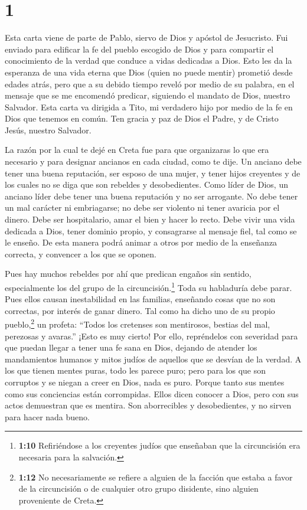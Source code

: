 \hypertarget{section}{%
\section{1}\label{section}}

 Esta carta viene de parte de Pablo, siervo de Dios y
apóstol de Jesucristo. Fui enviado para edificar la fe del pueblo
escogido de Dios y para compartir el conocimiento de la verdad que
conduce a vidas dedicadas a Dios.  Esto les da la esperanza
de una vida eterna que Dios (quien no puede mentir) prometió desde
edades atrás,  pero que a su debido tiempo reveló por medio
de su palabra, en el mensaje que se me encomendó predicar, siguiendo el
mandato de Dios, nuestro Salvador.  Esta carta va dirigida a
Tito, mi verdadero hijo por medio de la fe en Dios que tenemos en común.
Ten gracia y paz de Dios el Padre, y de Cristo Jesús, nuestro Salvador.

 La razón por la cual te dejé en Creta fue para que
organizaras lo que era necesario y para designar ancianos en cada
ciudad, como te dije.  Un anciano debe tener una buena
reputación, ser esposo de una mujer, y tener hijos creyentes y de los
cuales no se diga que son rebeldes y desobedientes.  Como
líder de Dios, un anciano líder debe tener una buena reputación y no ser
arrogante. No debe tener un mal carácter ni embriagarse; no debe ser
violento ni tener avaricia por el dinero.  Debe ser
hospitalario, amar el bien y hacer lo recto. Debe vivir una vida
dedicada a Dios, tener dominio propio,  y consagrarse al
mensaje fiel, tal como se le enseño. De esta manera podrá animar a otros
por medio de la enseñanza correcta, y convencer a los que se oponen.

 Pues hay muchos rebeldes por ahí que predican engaños sin
sentido, especialmente los del grupo de la circuncisión.\footnote{\textbf{1:10}
  Refiriéndose a los creyentes judíos que enseñaban que la circuncisión
  era necesaria para la salvación.}  Toda su habladuría
debe parar. Pues ellos causan inestabilidad en las familias, enseñando
cosas que no son correctas, por interés de ganar dinero. 
Tal como ha dicho uno de su propio pueblo,\footnote{\textbf{1:12} No
  necesariamente se refiere a alguien de la facción que estaba a favor
  de la circuncisión o de cualquier otro grupo disidente, sino alguien
  proveniente de Creta.} un profeta: ``Todos los cretenses son
mentirosos, bestias del mal, perezosas y avaras.''  ¡Esto
es muy cierto! Por ello, repréndelos con severidad para que puedan
llegar a tener una fe sana en Dios,  dejando de atender los
mandamientos humanos y mitos judíos de aquellos que se desvían de la
verdad.  A los que tienen mentes puras, todo les parece
puro; pero para los que son corruptos y se niegan a creer en Dios, nada
es puro. Porque tanto sus mentes como sus conciencias están corrompidas.
 Ellos dicen conocer a Dios, pero con sus actos demuestran
que es mentira. Son aborrecibles y desobedientes, y no sirven para hacer
nada bueno.

